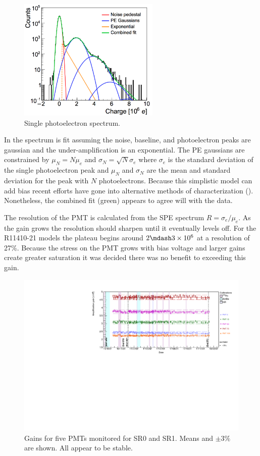 \begin{figure}
\centering
\includegraphics[width=0.6\textwidth]{SPESpectrum}
\caption{Single photoelectron spectrum.}
\label{fig:xenon1t_pmt_spe}
\end{figure}

In  the spectrum is fit assuming the noise, baseline, and photoelectron peaks are gaussian and the
under-amplification is
an exponential.  The PE gaussians are constrained by $\mu_{N} = N \mu_{e}$ and $\sigma_{N} = \sqrt{N} \sigma_{e}$ where $\sigma_{e}$ is the
standard deviation of the single photoelectron peak and $\mu_{N}$ and $\sigma_{N}$ are the mean and standard deviation for the peak with
$N$ photoelectrons.  Because this simplistic model can add bias recent efforts have gone into alternative methods
of characterization ().  Nonetheless, the combined fit (green) appears to agree will with the data.

The resolution of the PMT is calculated from the SPE spectrum $R = \sigma_{e} / \mu_{e}$.  As the gain grows the resolution should sharpen
until it eventually levels off.  For the R11410-21 models the plateau begins around $2 \mdash 3 \times 10^{6}$ at a resolution of
27\%.  Because the stress on the PMT grows with bias voltage and larger gains create greater saturation it was decided there was no
benefit to exceeding this gain.

\begin{figure}
\centering
\includegraphics[width=\textwidth]{PMTGainStability}
\caption{Gains for five PMTs monitored for SR0 and SR1.  Means and $\pm 3\%$ are shown.  All appear to be stable.}
\label{fig:xenon1t_pmt_time}
\end{figure}

